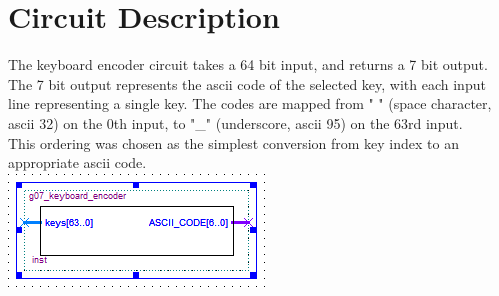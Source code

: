 \documentclass[report2]{subfiles}
\begin{document}
\section{Circuit Description}
The keyboard encoder circuit takes a 64 bit input, and returns a 7 bit output. The 7 bit output represents the ascii code of the selected key, with each input line representing a single key. The codes are mapped from " " (space character, ascii 32) on the 0th input, to "_" (underscore, ascii 95) on the 63rd input. \\
This ordering was chosen as the simplest conversion from key index to an appropriate ascii code. \\
\includegraphics[width=\textwidth]{keyboard_encode_symbol}
\end{document}
